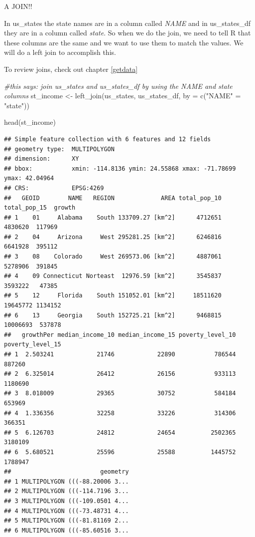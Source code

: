\documentclass[
]{book}
\newenvironment{Shaded}{\begin{snugshade}}{\end{snugshade}}
\newcommand{\AttributeTok}[1]{\textcolor[rgb]{0.77,0.63,0.00}{#1}}
\newcommand{\CommentTok}[1]{\textcolor[rgb]{0.56,0.35,0.01}{\textit{#1}}}
\newcommand{\FunctionTok}[1]{\textcolor[rgb]{0.00,0.00,0.00}{#1}}
\newcommand{\NormalTok}[1]{#1}
\newcommand{\OtherTok}[1]{\textcolor[rgb]{0.56,0.35,0.01}{#1}}
\newcommand{\StringTok}[1]{\textcolor[rgb]{0.31,0.60,0.02}{#1}}
\begin{document}
A JOIN!!

In us\_states the state names are in a column called \emph{NAME} and in us\_states\_df they are in a column called \emph{state}. So when we do the join, we need to tell R that these columns are the same and we want to use them to match the values. We will do a left join to accomplish this.

To review joins, check out chapter \ref{getdata}

\begin{Shaded}
\begin{Highlighting}[]
\CommentTok{\#this says: join us\_states and us\_states\_df by using the NAME and state columns}
\NormalTok{st\_income }\OtherTok{\textless{}{-}} \FunctionTok{left\_join}\NormalTok{(us\_states, us\_states\_df, }\AttributeTok{by =} \FunctionTok{c}\NormalTok{(}\StringTok{"NAME"} \OtherTok{=} \StringTok{"state"}\NormalTok{))}

\FunctionTok{head}\NormalTok{(st\_income)}
\end{Highlighting}
\end{Shaded}

\begin{verbatim}
## Simple feature collection with 6 features and 12 fields
## geometry type:  MULTIPOLYGON
## dimension:      XY
## bbox:           xmin: -114.8136 ymin: 24.55868 xmax: -71.78699 ymax: 42.04964
## CRS:            EPSG:4269
##   GEOID        NAME   REGION             AREA total_pop_10 total_pop_15  growth
## 1    01     Alabama    South 133709.27 [km^2]      4712651      4830620  117969
## 2    04     Arizona     West 295281.25 [km^2]      6246816      6641928  395112
## 3    08    Colorado     West 269573.06 [km^2]      4887061      5278906  391845
## 4    09 Connecticut Norteast  12976.59 [km^2]      3545837      3593222   47385
## 5    12     Florida    South 151052.01 [km^2]     18511620     19645772 1134152
## 6    13     Georgia    South 152725.21 [km^2]      9468815     10006693  537878
##   growthPer median_income_10 median_income_15 poverty_level_10 poverty_level_15
## 1  2.503241            21746            22890           786544           887260
## 2  6.325014            26412            26156           933113          1180690
## 3  8.018009            29365            30752           584184           653969
## 4  1.336356            32258            33226           314306           366351
## 5  6.126703            24812            24654          2502365          3180109
## 6  5.680521            25596            25588          1445752          1788947
##                         geometry
## 1 MULTIPOLYGON (((-88.20006 3...
## 2 MULTIPOLYGON (((-114.7196 3...
## 3 MULTIPOLYGON (((-109.0501 4...
## 4 MULTIPOLYGON (((-73.48731 4...
## 5 MULTIPOLYGON (((-81.81169 2...
## 6 MULTIPOLYGON (((-85.60516 3...
\end{verbatim}
\end{document}
